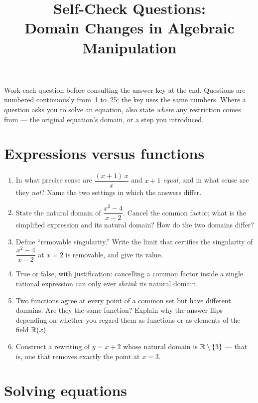 \documentclass{essay}
\title{Self-Check Questions:\\ Domain Changes in Algebraic Manipulation}
\author{}
\date{}
\begin{document}
\maketitle

Work each question before consulting the answer key at the end. Questions are numbered
continuously from~1 to~25; the key uses the same numbers. Where a question asks you to
solve an equation, also state \emph{where} any restriction comes from --- the original
equation's domain, or a step you introduced.

\section{Expressions versus functions}

\begin{enumerate}

  \item In what precise sense are $\dfrac{(x+1)\,x}{x}$ and $x+1$ \emph{equal}, and in what
    sense are they \emph{not}? Name the two settings in which the answers differ.

  \item State the natural domain of $\dfrac{x^2-4}{x-2}$. Cancel the common factor; what is
    the simplified expression and its natural domain? How do the two domains differ?

  \item Define ``removable singularity.'' Write the limit that certifies the singularity of
    $\dfrac{x^2-4}{x-2}$ at $x=2$ is removable, and give its value.

  \item True or false, with justification: cancelling a common factor inside a single rational
    expression can only ever \emph{shrink} its natural domain.

  \item Two functions agree at every point of a common set but have different domains. Are they
    the same function? Explain why the answer flips depending on whether you regard them as
    functions or as elements of the field $\mathbb{R}(x)$.

  \item Construct a rewriting of $y = x+2$ whose natural domain is $\mathbb{R}\setminus\{3\}$
    --- that is, one that removes exactly the point at $x=3$.

\end{enumerate}

\section{Solving equations}
\end{document}
